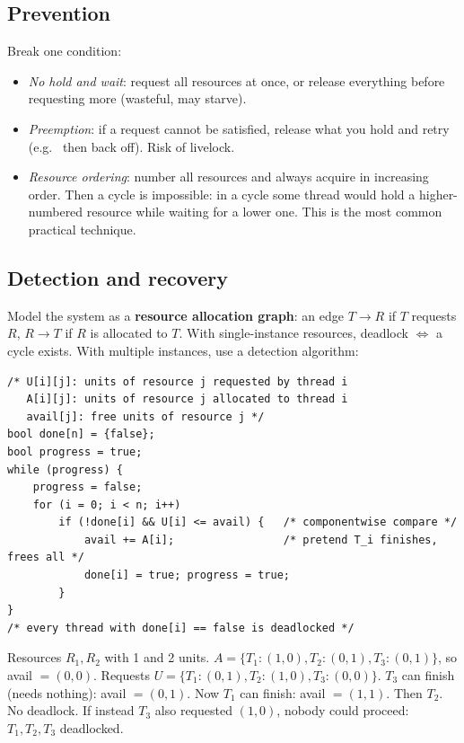 \subsection{Prevention} Break one condition:
\begin{itemize}
  \item \emph{No hold and wait}: request all resources at once, or release everything before
    requesting more (wasteful, may starve).
  \item \emph{Preemption}: if a request cannot be satisfied, release what you hold and retry
    (e.g.\  then back off). Risk of livelock.
  \item \emph{Resource ordering}: number all resources and always acquire in increasing
    order. Then a cycle is impossible: in a cycle some thread would hold a higher-numbered
    resource while waiting for a lower one. This is the most common practical technique.
\end{itemize}

\subsection{Detection and recovery}
Model the system as a \textbf{resource allocation graph}: an edge $T \to R$ if $T$ requests $R$,
$R \to T$ if $R$ is allocated to $T$. With single-instance resources, deadlock $\iff$ a cycle
exists. With multiple instances, use a detection algorithm:

\begin{lstlisting}[style=c]
/* U[i][j]: units of resource j requested by thread i
   A[i][j]: units of resource j allocated to thread i
   avail[j]: free units of resource j */
bool done[n] = {false};
bool progress = true;
while (progress) {
    progress = false;
    for (i = 0; i < n; i++)
        if (!done[i] && U[i] <= avail) {   /* componentwise compare */
            avail += A[i];                 /* pretend T_i finishes, frees all */
            done[i] = true; progress = true;
        }
}
/* every thread with done[i] == false is deadlocked */
\end{lstlisting}

\begin{example}
Resources $R_1,R_2$ with 1 and 2 units. $A = \{T_1:(1,0), T_2:(0,1), T_3:(0,1)\}$, so
avail $=(0,0)$. Requests $U = \{T_1:(0,1), T_2:(1,0), T_3:(0,0)\}$. $T_3$ can finish (needs
nothing): avail $=(0,1)$. Now $T_1$ can finish: avail $=(1,1)$. Then $T_2$. No deadlock.
If instead $T_3$ also requested $(1,0)$, nobody could proceed: $T_1,T_2,T_3$ deadlocked.
\end{example}


